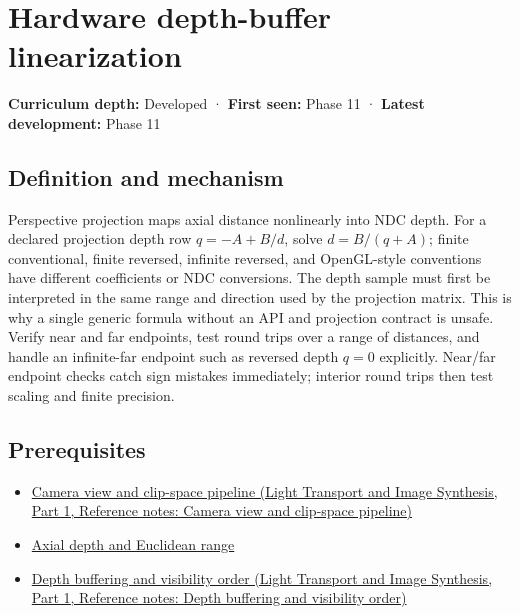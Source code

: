 \hypertarget{appendix-1bc40b08db4a}{}\label{referencestart:appendix-1bc40b08db4a}
\section{Hardware depth-buffer linearization}\label{appendix-1bc40b08db4a-hardware-depth-buffer-linearization}

\hypertarget{appendix-1bc40b08db4a-hardware-depth-buffer-linearization}{}

\textbf{Curriculum depth:} Developed · \textbf{First seen:} Phase 11 · \textbf{Latest development:} Phase 11

\begin{allmightroledefinition}

\subsection{Definition and mechanism}\label{appendix-1bc40b08db4a-definition-and-mechanism}

\hypertarget{appendix-1bc40b08db4a-definition-and-mechanism}{}

Perspective projection maps axial distance nonlinearly into NDC depth. For a declared projection depth row \(q=-A+B/d\), solve \(d=B/(q+A)\); finite conventional, finite reversed, infinite reversed, and OpenGL-style conventions have different coefficients or NDC conversions. The depth sample must first be interpreted in the same range and direction used by the projection matrix. This is why a single generic formula without an API and projection contract is unsafe. Verify near and far endpoints, test round trips over a range of distances, and handle an infinite-far endpoint such as reversed depth \(q=0\) explicitly. Near/far endpoint checks catch sign mistakes immediately; interior round trips then test scaling and finite precision.

\end{allmightroledefinition}

\subsection{Prerequisites}\label{appendix-1bc40b08db4a-prerequisites}

\hypertarget{appendix-1bc40b08db4a-prerequisites}{}

\begin{itemize}
\tightlist
\item
  \href{../04-Light-Transport-and-Image-Synthesis-P01/main.pdf\#nameddest=appendix-1c07d64f5e70}{Camera view and clip-space pipeline (Light Transport and Image Synthesis, Part 1, Reference notes: Camera view and clip-space pipeline)}
\item
  \hyperref[appendix-cac01ebeeb11]{Axial depth and Euclidean range}
\item
  \href{../04-Light-Transport-and-Image-Synthesis-P01/main.pdf\#nameddest=appendix-97578ed97952}{Depth buffering and visibility order (Light Transport and Image Synthesis, Part 1, Reference notes: Depth buffering and visibility order)}
\end{itemize}

